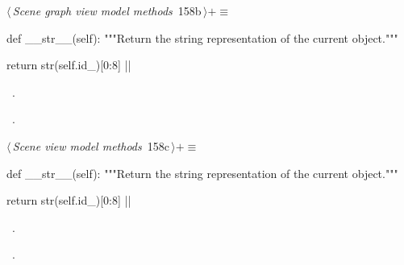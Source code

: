 \documentclass[%
    a4paper,    %
    justified,  %
    nobib,      %
    openany     %
]{tufte-book}
\begin{document}
\begin{flushleft} \small
\begin{minipage}{\linewidth}\label{scrap171}\raggedright\small
{} $\langle\,${\itshape Scene graph view model methods}\nobreak\ {\footnotesize {158b}}$\,\rangle+\equiv$
\vspace{-1ex}
\begin{pythoncode}
def __str__(self):
    """Return the string representation of the current object."""

    return str(self.id_)[0:8]
|\NWsep|
\end{pythoncode}
\vspace{1.5ex}
\footnotesize
\begin{list}{}{\setlength{\itemsep}{-\parsep}\setlength{\itemindent}{-\leftmargin}}
\item \NWtxtMacroDefBy\ .
\item \NWtxtMacroRefIn\ .

\item{}
\end{list}
\end{minipage}\vspace{4ex}
\end{flushleft}
\begin{flushleft} \small
\begin{minipage}{\linewidth}\label{scrap172}\raggedright\small
{} $\langle\,${\itshape Scene view model methods}\nobreak\ {\footnotesize {158c}}$\,\rangle+\equiv$
\vspace{-1ex}
\begin{pythoncode}
def __str__(self):
    """Return the string representation of the current object."""

    return str(self.id_)[0:8]
|\NWsep|
\end{pythoncode}
\vspace{1.5ex}
\footnotesize
\begin{list}{}{\setlength{\itemsep}{-\parsep}\setlength{\itemindent}{-\leftmargin}}
\item \NWtxtMacroDefBy\ .
\item \NWtxtMacroRefIn\ .

\item{}
\end{list}
\end{minipage}\vspace{4ex}
\end{flushleft}
\end{document}
